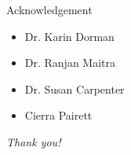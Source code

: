 \documentclass{beamer}
\begin{document}

\begin{frame}{Acknowledgement}

\begin{itemize}
\item Dr. Karin Dorman
\item Dr. Ranjan Maitra
\item Dr. Susan Carpenter
\item Cierra Pairett
\end{itemize}

\vspace{2.5cm}
\Huge
\centering
\color{dgreen}
{\it Thank you!}

\end{frame}
\end{document}
